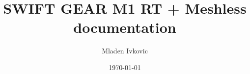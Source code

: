 



\newcommand{\deprecated}[1]{\textcolor{red}{NOTE: DEPRECATED \$\$ }\textcolor{gray}{\textit{#1}} \textcolor{red}{\$\$}}


\title{SWIFT GEAR M1 RT + Meshless documentation}
\author{Mladen Ivkovic}
\date{\today}










\maketitle
\tableofcontents
\clearpage







% 












\appendix{}






